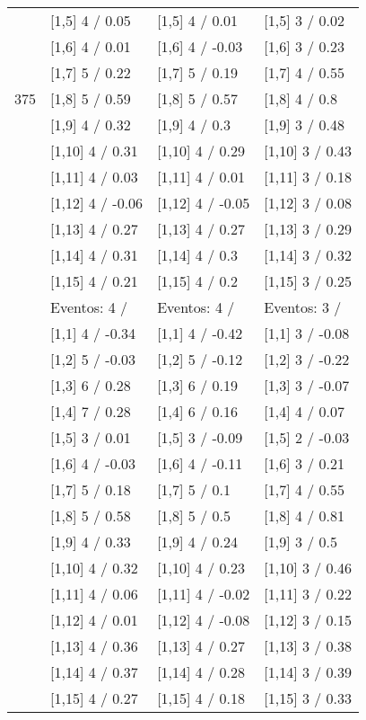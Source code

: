 \begin{table}
\begin{tabular}[t]{llll}
 & {}[1,5] 4  / 0.05 & {}[1,5] 4  / 0.01 & {}[1,5] 3  / 0.02\\
 & {}[1,6] 4  / 0.01 & {}[1,6] 4  / -0.03 & {}[1,6] 3  / 0.23\\
 & {}[1,7] 5  / 0.22 & {}[1,7] 5  / 0.19 & {}[1,7] 4  / 0.55\\
375 & {}[1,8] 5  / 0.59 & {}[1,8] 5  / 0.57 & {}[1,8] 4  / 0.8\\
\addlinespace
 & {}[1,9] 4  / 0.32 & {}[1,9] 4  / 0.3 & {}[1,9] 3  / 0.48\\
 & {}[1,10] 4  / 0.31 & {}[1,10] 4  / 0.29 & {}[1,10] 3  / 0.43\\
 & {}[1,11] 4  / 0.03 & {}[1,11] 4  / 0.01 & {}[1,11] 3  / 0.18\\
 & {}[1,12] 4  / -0.06 & {}[1,12] 4  / -0.05 & {}[1,12] 3  / 0.08\\
 & {}[1,13] 4  / 0.27 & {}[1,13] 4  / 0.27 & {}[1,13] 3  / 0.29\\
\addlinespace
 & {}[1,14] 4  / 0.31 & {}[1,14] 4  / 0.3 & {}[1,14] 3  / 0.32\\
 & {}[1,15] 4  / 0.21 & {}[1,15] 4  / 0.2 & {}[1,15] 3  / 0.25\\
 & Eventos:  4 / & Eventos:  4 / & Eventos:  3 /\\
 & {}[1,1] 4  / -0.34 & {}[1,1] 4  / -0.42 & {}[1,1] 3  / -0.08\\
 & {}[1,2] 5  / -0.03 & {}[1,2] 5  / -0.12 & {}[1,2] 3  / -0.22\\
\addlinespace
 & {}[1,3] 6  / 0.28 & {}[1,3] 6  / 0.19 & {}[1,3] 3  / -0.07\\
 & {}[1,4] 7  / 0.28 & {}[1,4] 6  / 0.16 & {}[1,4] 4  / 0.07\\
 & {}[1,5] 3  / 0.01 & {}[1,5] 3  / -0.09 & {}[1,5] 2  / -0.03\\
 & {}[1,6] 4  / -0.03 & {}[1,6] 4  / -0.11 & {}[1,6] 3  / 0.21\\
 & {}[1,7] 5  / 0.18 & {}[1,7] 5  / 0.1 & {}[1,7] 4  / 0.55\\
\addlinespace
500 & {}[1,8] 5  / 0.58 & {}[1,8] 5  / 0.5 & {}[1,8] 4  / 0.81\\
 & {}[1,9] 4  / 0.33 & {}[1,9] 4  / 0.24 & {}[1,9] 3  / 0.5\\
 & {}[1,10] 4  / 0.32 & {}[1,10] 4  / 0.23 & {}[1,10] 3  / 0.46\\
 & {}[1,11] 4  / 0.06 & {}[1,11] 4  / -0.02 & {}[1,11] 3  / 0.22\\
 & {}[1,12] 4  / 0.01 & {}[1,12] 4  / -0.08 & {}[1,12] 3  / 0.15\\
\addlinespace
 & {}[1,13] 4  / 0.36 & {}[1,13] 4  / 0.27 & {}[1,13] 3  / 0.38\\
 & {}[1,14] 4  / 0.37 & {}[1,14] 4  / 0.28 & {}[1,14] 3  / 0.39\\
 & {}[1,15] 4  / 0.27 & {}[1,15] 4  / 0.18 & {}[1,15] 3  / 0.33\\
\bottomrule
\end{tabular}
\end{table}
